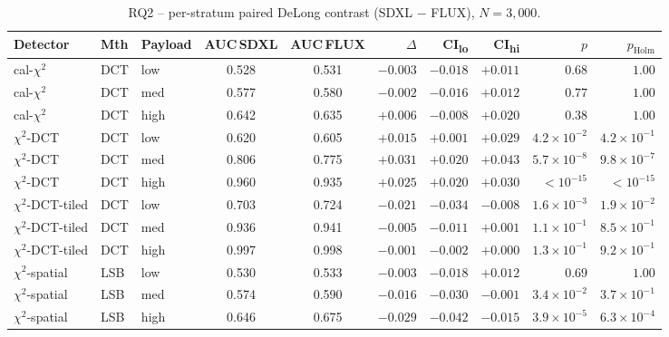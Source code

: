 \documentclass[10pt,twocolumn,a4paper]{article}
\begin{document}
\begin{table}[h]
\centering\footnotesize
\caption{RQ2 -- per-stratum paired DeLong contrast (SDXL $-$ FLUX), $N\!=\!3{,}000$.}
\label{tab:appendix-rq2}
\setlength{\tabcolsep}{4pt}\renewcommand{\arraystretch}{1.1}
\begin{tabular}{@{}l l l c c r r r r r@{}}
\toprule
\textbf{Detector} & \textbf{Mth} & \textbf{Payload} & \textbf{AUC\,SDXL} & \textbf{AUC\,FLUX} & \textbf{$\Delta$} & \textbf{CI\textsubscript{lo}} & \textbf{CI\textsubscript{hi}} & \textbf{$p$} & \textbf{$p_\text{Holm}$} \\
\midrule
cal-$\chi^2$         & DCT & low    & 0.528 & 0.531 & $-0.003$ & $-0.018$ & $+0.011$ & $0.68$  & $1.00$ \\
cal-$\chi^2$         & DCT & med    & 0.577 & 0.580 & $-0.002$ & $-0.016$ & $+0.012$ & $0.77$  & $1.00$ \\
cal-$\chi^2$         & DCT & high   & 0.642 & 0.635 & $+0.006$ & $-0.008$ & $+0.020$ & $0.38$  & $1.00$ \\
$\chi^2$-DCT         & DCT & low    & 0.620 & 0.605 & $+0.015$ & $+0.001$ & $+0.029$ & $4.2\!\times\!10^{-2}$  & $4.2\!\times\!10^{-1}$ \\
$\chi^2$-DCT         & DCT & med    & 0.806 & 0.775 & $+0.031$ & $+0.020$ & $+0.043$ & $5.7\!\times\!10^{-8}$  & $9.8\!\times\!10^{-7}$ \\
$\chi^2$-DCT         & DCT & high   & 0.960 & 0.935 & $+0.025$ & $+0.020$ & $+0.030$ & $<\!10^{-15}$            & $<\!10^{-15}$ \\
$\chi^2$-DCT-tiled   & DCT & low    & 0.703 & 0.724 & $-0.021$ & $-0.034$ & $-0.008$ & $1.6\!\times\!10^{-3}$  & $1.9\!\times\!10^{-2}$ \\
$\chi^2$-DCT-tiled   & DCT & med    & 0.936 & 0.941 & $-0.005$ & $-0.011$ & $+0.001$ & $1.1\!\times\!10^{-1}$  & $8.5\!\times\!10^{-1}$ \\
$\chi^2$-DCT-tiled   & DCT & high   & 0.997 & 0.998 & $-0.001$ & $-0.002$ & $+0.000$ & $1.3\!\times\!10^{-1}$  & $9.2\!\times\!10^{-1}$ \\
$\chi^2$-spatial     & LSB & low    & 0.530 & 0.533 & $-0.003$ & $-0.018$ & $+0.012$ & $0.69$  & $1.00$ \\
$\chi^2$-spatial     & LSB & med    & 0.574 & 0.590 & $-0.016$ & $-0.030$ & $-0.001$ & $3.4\!\times\!10^{-2}$  & $3.7\!\times\!10^{-1}$ \\
$\chi^2$-spatial     & LSB & high   & 0.646 & 0.675 & $-0.029$ & $-0.042$ & $-0.015$ & $3.9\!\times\!10^{-5}$  & $6.3\!\times\!10^{-4}$ \\

\end{tabular}
\end{table}
\end{document}
